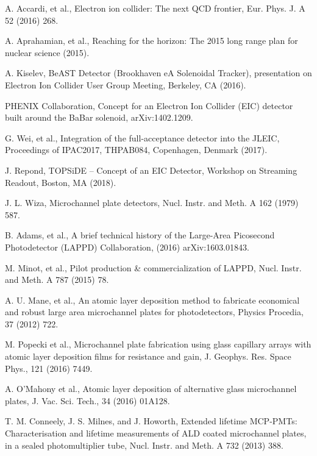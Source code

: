 \documentclass[preprint,5p]{elsarticle}
\begin{document}
  

\begin{thebibliography}{00}

A. Accardi, et al., Electron ion collider: The next QCD frontier, Eur. Phys.  
      J. A 52 (2016) 268.

A. Aprahamian, et al., Reaching for the horizon: The 2015 long range plan for 
      nuclear science (2015).

A. Kiselev, BeAST Detector (Brookhaven eA Solenoidal Tracker), presentation on 
      Electron Ion Collider User Group Meeting, Berkeley, CA (2016).

PHENIX Collaboration, Concept for an Electron Ion Collider (EIC) detector built 
      around the BaBar solenoid, arXiv:1402.1209.

G. Wei, et al., Integration of the full-acceptance detector into the JLEIC, 
      Proceedings of IPAC2017, THPAB084, Copenhagen, Denmark (2017).

J. Repond, TOPSiDE – Concept of an EIC Detector, Workshop on Streaming Readout, 
      Boston, MA (2018).

J. L. Wiza, Microchannel plate detectors, Nucl. Instr. and Meth. A 162 (1979) 
      587.

B. Adams, et al., A brief technical history of the Large-Area Picosecond 
      Photodetector (LAPPD) Collaboration, (2016) arXiv:1603.01843.

M. Minot, et al., Pilot production \& commercialization of LAPPD, Nucl.  
      Instr. and Meth. A 787 (2015) 78.

A. U. Mane, et al., An atomic layer deposition method to fabricate economical and robust large area microchannel plates for photodetectors, Physics Procedia, 37 (2012) 722.

M. Popecki et al., Microchannel plate fabrication using glass capillary arrays 
      with atomic layer deposition films for resistance and gain, J.  Geophys.  
      Res. Space Phys., 121 (2016) 7449.

A. O'Mahony et al., Atomic layer deposition of alternative glass microchannel 
      plates, J. Vac. Sci. Tech., 34 (2016) 01A128.

T. M. Conneely, J. S. Milnes, and J. Howorth, Extended lifetime MCP-PMTs: 
      Characterisation and lifetime measurements of ALD coated microchannel 
      plates, in a sealed photomultiplier tube, Nucl. Instr. and Meth. A 732 
      (2013) 388.


\end{thebibliography}
\end{document}
